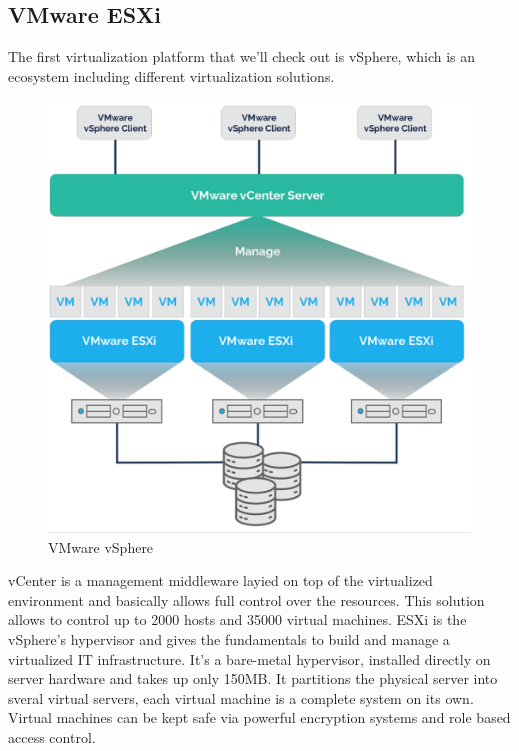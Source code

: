 \subsection{VMware ESXi}
The first virtualization platform that we'll check out is vSphere, which is an ecosystem including different virtualization solutions.
\begin{figure}
    \centering
    \includegraphics[scale=0.4]{img/ESXi.png}
    \caption{VMware vSphere}
\end{figure}
vCenter is a management middleware layied on top of the virtualized environment and basically allows full control over the resources. This solution allows to control up to 2000 hosts and 35000 virtual machines. \n
ESXi is the vSphere's hypervisor and gives the fundamentals to build and manage a virtualized IT infrastructure. It's a bare-metal hypervisor, installed directly on server hardware and takes up only 150MB. It partitions the physical server into sveral virtual servers, each virtual machine is a complete system on its own. \n
Virtual machines can be kept safe via powerful encryption systems and role based access control.
